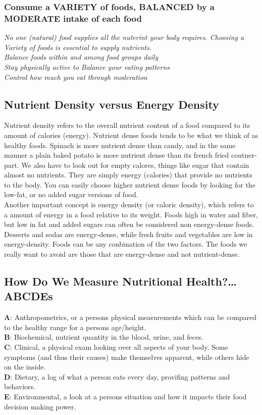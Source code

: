 \documentclass[letterpaper, 11pt]{article}
\begin{document}
\subsubsection{Consume a VARIETY of foods, BALANCED by a MODERATE intake of each food}
\label{sec:org6905218}
\emph{No one (natural) food supplies all the nuterint your body requires. Choosing a Variety of foods is essential to supply nutrients.}\\
\emph{Balance foods within and among food groups daily}\\
\emph{Stay physically active to Balance your eating patterns}\\
\emph{Control how much you eat through moderation}\\
\subsection{Nutrient Density versus Energy Density}
\label{sec:org2f3ff42}
Nutrient density refers to the overall nutrient content of a food compared to its amount of calories (energy). Nutrient dense foods tends to be what we think of as healthy foods. Spinach is more nutrient dense than candy, and in the same manner a plain baked potato is more nutrient dense than its french fried coutner-part. We also have to look out for empty calores, things like sugar that contain almost no nutrients. They are simply energy (calories) that provide no nutrients to the body. You can easily choose higher nutrient dense foods by looking for the low-fat, or no added sugar versions of food.\\
Another important concept is energy density (or caloric density), which refers to a amount of energy in a food relative to its weight. Foods high in water and fiber, but low in fat and added sugars can often be considered non energy-dense foods. Desserts and sodas are energy-dense, while fresh fruits and vegetables are low in energy-density. Foods can be any conbination of the two factors. The foods we really want to avoid are those that are energy-dense and not nutrient-dense.\\
\subsection{How Do We Measure Nutritional Health?\ldots{} ABCDEs}
\label{sec:org0ab8d60}
\textbf{A}: Anthropometrics, or a persons physical measurements which can be compared to the healthy range for a persons age/height.\\
\textbf{B}: Biochemical,  nutrient quantity in the blood, urine, and feces.\\
\textbf{C}: Clinical, a physical exam looking over all aspects of your body. Some symptoms (and thus their causes) make themselves apparent, while others hide on the inside.\\
\textbf{D}: Dietary, a log of what a person eats every day, provifing patterns and behaviors.\\
\textbf{E}: Environmental, a look at a persons situation and how it impacts their food decision making power.\\
\end{document}

